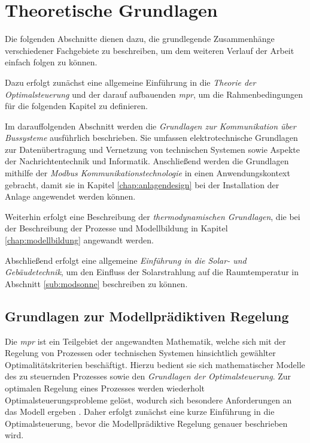 \renewcommand{\chapterheadstartvskip}{\vspace*{2cm}}

\chapter{Theoretische Grundlagen}
\label{chap:theoretischegrundlagen}

Die folgenden Abschnitte dienen dazu, die grundlegende Zusammenhänge verschiedener Fachgebiete zu beschreiben, um dem weiteren Verlauf der Arbeit einfach folgen zu können.

 Dazu erfolgt zunächst eine allgemeine Einführung in die \textit{Theorie der Optimalsteuerung} und der darauf aufbauenden \textit{\acrlong{mpr}}, um die Rahmenbedingungen für die folgenden Kapitel zu definieren. 
 
Im darauffolgenden Abschnitt werden die \textit{Grundlagen zur Kommunikation über Bussysteme} ausführlich beschrieben. Sie umfassen elektrotechnische Grundlagen zur Datenübertragung und Vernetzung von technischen Systemen sowie Aspekte der Nachrichtentechnik und Informatik. Anschließend werden die Grundlagen mithilfe der \textit{Modbus Kommunikationstechnologie} in einen Anwendungskontext gebracht, damit sie in Kapitel \ref{chap:anlagendesign} bei der Installation der Anlage angewendet werden können.

Weiterhin erfolgt eine Beschreibung der \textit{thermodynamischen Grundlagen}, die bei der Beschreibung der Prozesse und Modellbildung in Kapitel \ref{chap:modellbildung} angewandt werden. 

Abschließend erfolgt eine allgemeine \textit{Einführung in die Solar- und Gebäudetechnik}, um den Einfluss der Solarstrahlung auf die Raumtemperatur in Abschnitt \ref{sub:modsonne} beschreiben zu können.

\section{Grundlagen zur Modellprädiktiven Regelung}
\label{sec:mpc}

Die \textit{\acrlong{mpr}} ist ein Teilgebiet der angewandten Mathematik, welche sich mit der Regelung von Prozessen oder technischen Systemen hinsichtlich gewählter Optimalitätskriterien beschäftigt. Hierzu bedient sie sich mathematischer Modelle des zu steuernden Prozesses sowie den \textit{Grundlagen der Optimalsteuerung}. Zur optimalen Regelung eines Prozesses werden wiederholt Optimalsteuerungsprobleme gelöst, wodurch sich besondere Anforderungen an das Modell ergeben \cite[S.~10]{di14}. Daher erfolgt zunächst eine kurze Einführung in die Optimalsteuerung, bevor die Modellprädiktive Regelung genauer beschrieben wird.

